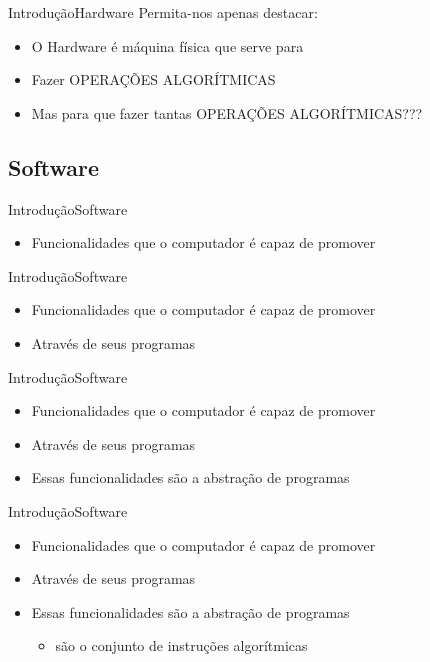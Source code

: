 \documentclass{beamer}
\begin{document}
      \begin{frame}{Introdução}{Hardware}
        Permita-nos apenas destacar:
        \begin{itemize}
          \item O Hardware é máquina física que serve para 
          \item Fazer OPERAÇÕES ALGORÍTMICAS
          \item Mas para que fazer tantas OPERAÇÕES ALGORÍTMICAS???
        \end{itemize}
      \end{frame}


    \subsection{Software}

      \begin{frame}{Introdução}{Software}
        \begin{itemize}
          \item Funcionalidades que o computador é capaz de promover
          \end{itemize}
      \end{frame}

      \begin{frame}{Introdução}{Software}
        \begin{itemize}
          \item Funcionalidades que o computador é capaz de promover
          \item Através de seus programas
          \end{itemize}
      \end{frame}

      \begin{frame}{Introdução}{Software}
        \begin{itemize}
          \item Funcionalidades que o computador é capaz de promover
          \item Através de seus programas
          \item Essas funcionalidades são a abstração de programas
          \end{itemize}
      \end{frame}

      \begin{frame}{Introdução}{Software}
        \begin{itemize}
          \item Funcionalidades que o computador é capaz de promover
          \item Através de seus programas
          \item Essas funcionalidades são a abstração de programas
            \begin{itemize}
              \item são o conjunto de instruções algorítmicas
            \end{itemize}
          \end{itemize}
      \end{frame}
\end{document}
